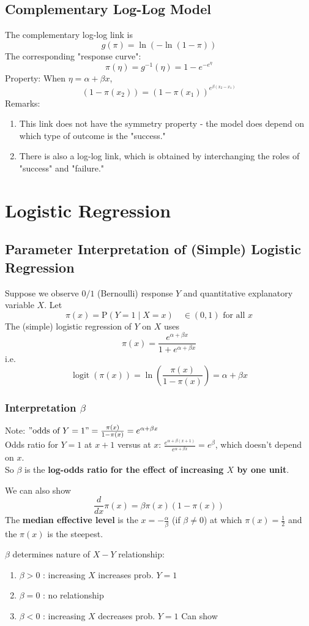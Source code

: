 \documentclass[11pt]{elegantbook}
\begin{document}
\section{Complementary Log-Log Model}
The complementary log-log link is
$$
g(\pi)=\ln (-\ln (1-\pi))
$$
The corresponding "response curve":
$$
\pi(\eta)=g^{-1}(\eta)=1-e^{-e^\eta}
$$
Property: When $\eta=\alpha+\beta x$,
$$(1-\pi(x_2))=(1-\pi(x_1))^{e^{\beta(x_2-x_1)}}$$
Remarks:
\begin{enumerate}[$\bullet$]
    \item This link does not have the symmetry property - the model does depend on which type of outcome is the "success."
    \item There is also a log-log link, which is obtained by interchanging the roles of "success" and "failure."
\end{enumerate}

\chapter{Logistic Regression}
\section{Parameter Interpretation of (Simple) Logistic Regression}
Suppose we observe $0 / 1$ (Bernoulli) response $Y$ and quantitative explanatory variable $X$.
Let
$$
\pi(x)=\mathrm{P}(Y=1 \mid X=x) \quad \in(0,1) \text { for all } x
$$
The (simple) logistic regression of $Y$ on $X$ uses
$$
\pi(x)=\frac{e^{\alpha+\beta x}}{1+e^{\alpha+\beta x}}
$$
i.e.
$$
\operatorname{logit}(\pi(x))=\ln \left(\frac{\pi(x)}{1-\pi(x)}\right)=\alpha+\beta x
$$
\subsection{Interpretation $\beta$}
Note: $"\text {odds of } Y=1"=\frac{\pi(x)}{1-\pi(x)}=e^{\alpha+\beta x}$\\
Odds ratio for $Y=1$ at $x+1$ versus at $x$: $\frac{e^{\alpha+\beta(x+1)}}{e^{\alpha+\beta x}}=e^\beta$, which doesn't depend on $x$.\\
So $\beta$ is the \textbf{log-odds ratio for the effect of increasing $X$ by one unit}.

We can also show $$\frac{d}{d x} \pi(x)=\beta \pi(x)(1-\pi(x))$$
The \textbf{median effective level} is the $x=-\frac{\alpha}{\beta}$ (if $\beta\neq 0$) at which $\pi(x) = \frac{1}{2}$ and the $\pi(x)$ is the steepest.

$\beta$ determines nature of $X-Y$ relationship:
\begin{enumerate}[-]
    \item $\beta>0$ : increasing $X$ increases prob. $Y=1$
    \item $\beta=0$ : no relationship
    \item $\beta<0$ : increasing $X$ decreases prob. $Y=1$
    Can show
\end{enumerate}
\end{document}
